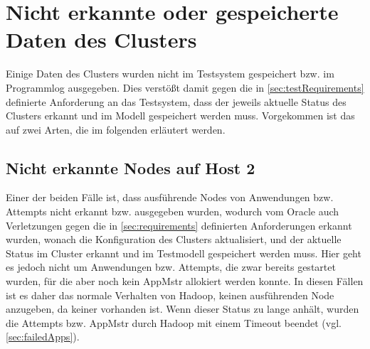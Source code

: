 \section{Nicht erkannte oder gespeicherte Daten des Clusters}
\label{sec:notDetectedData}

Einige Daten des Clusters wurden nicht im Testsystem gespeichert bzw. im Programmlog ausgegeben.
Dies verstößt damit gegen die in \autoref{sec:testRequirements} definierte Anforderung an das Testsystem, dass der jeweils aktuelle Status des Clusters erkannt und im Modell gespeichert werden muss.
Vorgekommen ist das auf zwei Arten, die im folgenden erläutert werden.

\subsection{Nicht erkannte Nodes auf Host 2}
\label{sec:notDetectedHost2}

Einer der beiden Fälle ist, dass ausführende Nodes von Anwendungen bzw. Attempts nicht erkannt bzw. ausgegeben wurden, wodurch vom Oracle auch Verletzungen gegen die in \autoref{sec:requirements} definierten Anforderungen erkannt wurden, wonach die Konfiguration des Clusters aktualisiert, und der aktuelle Status im Cluster erkannt und im Testmodell gespeichert werden muss.
Hier geht es jedoch nicht um Anwendungen bzw. Attempts, die zwar bereits gestartet wurden, für die aber noch kein \ac{AppMstr} allokiert werden konnte.
In diesen Fällen ist es daher das normale Verhalten von Hadoop, keinen ausführenden Node anzugeben, da keiner vorhanden ist.
Wenn dieser Status zu lange anhält, wurden die Attempts bzw. \ac{AppMstr} durch Hadoop mit einem Timeout beendet (vgl. \autoref{sec:failedApps}).

